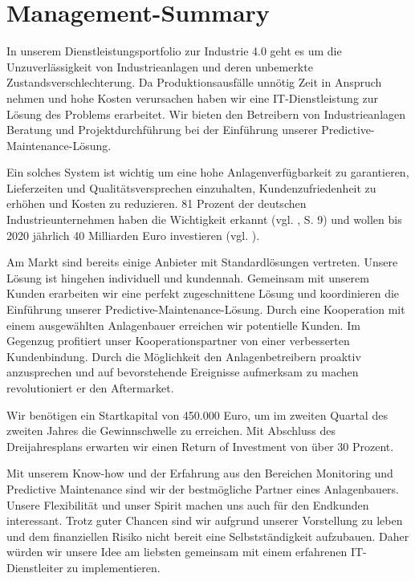 \section{Management-Summary}

In unserem Dienstleistungsportfolio zur Industrie 4.0 geht es um die Unzuverlässigkeit von Industrieanlagen und deren unbemerkte Zustandsverschlechterung. Da Produktionsausfälle unnötig Zeit in Anspruch nehmen und hohe Kosten verursachen haben wir eine IT-Dienstleistung zur Lösung des Problems erarbeitet. Wir bieten den Betreibern von Industrieanlagen Beratung und Projektdurchführung bei der Einführung unserer Predictive-Maintenance-Lösung.

Ein solches System ist wichtig um eine hohe Anlagenverfügbarkeit zu garantieren, Lieferzeiten und Qualitätsversprechen einzuhalten, Kundenzufriedenheit zu erhöhen und Kosten zu reduzieren. 81 Prozent der deutschen Industrieunternehmen haben die Wichtigkeit erkannt (vgl. \cite{SasForsa}, S. 9) und wollen bis 2020 jährlich 40 Milliarden Euro investieren (vgl. \cite{IndustrieHohesPotenzial}).

Am Markt sind bereits einige Anbieter mit Standardlösungen vertreten. Unsere Lösung ist hingehen individuell und kundennah. Gemeinsam mit unserem Kunden erarbeiten wir eine perfekt zugeschnittene Lösung und koordinieren die Einführung unserer Predictive-Maintenance-Lösung. Durch eine Kooperation mit einem ausgewählten Anlagenbauer erreichen wir potentielle Kunden. Im Gegenzug profitiert unser Kooperationspartner von einer verbesserten Kundenbindung. Durch die Möglichkeit den Anlagenbetreibern proaktiv anzusprechen und auf bevorstehende Ereignisse aufmerksam zu machen revolutioniert er den Aftermarket.

Wir benötigen ein Startkapital von 450.000 Euro, um im zweiten Quartal des zweiten Jahres die Gewinnschwelle zu erreichen. Mit Abschluss des Dreijahresplans erwarten wir einen Return of Investment von über 30 Prozent.

Mit unserem Know-how und der Erfahrung aus den Bereichen Monitoring und Predictive Maintenance sind wir der bestmögliche Partner eines Anlagenbauers. Unsere Flexibilität und unser Spirit machen uns auch für den Endkunden interessant. Trotz guter Chancen sind wir aufgrund unserer Vorstellung zu leben und dem finanziellen Risiko nicht bereit eine Selbstständigkeit aufzubauen. Daher würden wir unsere Idee am liebsten gemeinsam mit einem erfahrenen IT-Dienstleiter zu implementieren.
